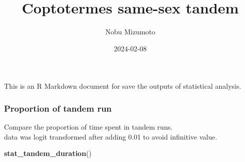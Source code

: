 \documentclass[
]{article}
\title{Coptotermes same-sex tandem}
\author{Nobu Mizumoto}
\date{2024-02-08}
\newenvironment{Shaded}{\begin{snugshade}}{\end{snugshade}}
\newcommand{\FunctionTok}[1]{\textcolor[rgb]{0.13,0.29,0.53}{\textbf{#1}}}
\newcommand{\NormalTok}[1]{#1}
\begin{document}
\maketitle

This is an R Markdown document for save the outputs of statistical
analysis.

\hypertarget{proportion-of-tandem-run}{%
\subsubsection{Proportion of tandem
run}\label{proportion-of-tandem-run}}

Compare the proportion of time spent in tandem runs.\\
data was logit transformed after adding 0.01 to avoid infinitive value.

\begin{Shaded}
\begin{Highlighting}[]
\FunctionTok{stat\_tandem\_duration}\NormalTok{()}
\end{Highlighting}
\end{Shaded}
\end{document}

